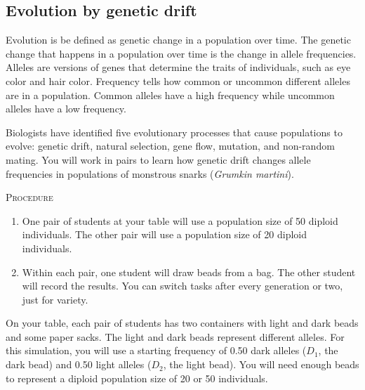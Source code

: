 \documentclass[12pt]{exam}
\begin{document}
\subsection*{Evolution by genetic drift}

Evolution is be defined as genetic change in a population over time. 
The genetic change that happens in a population over time is the change 
in allele frequencies. Alleles are versions of genes that determine the 
traits of individuals, such as eye color and hair color. Frequency tells 
how common or uncommon different alleles are in a population. Common 
alleles have a high frequency while uncommon alleles have a low frequency.  

Biologists have identified five evolutionary processes that cause 
populations to evolve: genetic drift, natural selection, gene flow, 
mutation, and non-random mating. You will work in pairs to learn how 
genetic drift changes allele frequencies in populations of monstrous snarks
(\textit{Grumkin martini}). 

\bigskip

\textsc{Procedure}

\medskip

\begin{enumerate}
	\item One pair of students at your table will use a population size of 
	50 diploid individuals. The other pair will use a population size of 20
	diploid individuals. 
	
	\item Within each pair, one student will draw beads from a bag. The other
	student will record the results. You can switch tasks after every 
	generation or two, just for variety.
	
\end{enumerate}

On your table, each pair of students has two containers with light and dark beads and some 
paper sacks. The light and dark beads represent different alleles. For this 
simulation, you will use a starting frequency of 0.50 dark alleles ($D_1$, the dark 
bead) and 0.50 light alleles ($D_2$, the light bead). You will need enough beads 
to represent a diploid population size of 20 or 50 individuals.
\end{document}
